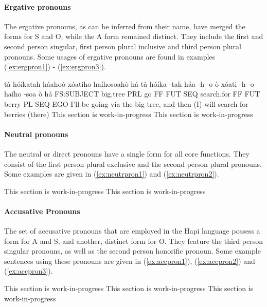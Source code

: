 \documentclass[a4paper, 12pt, oneside]{memoir}
\begin{document}
\paragraph{Ergative pronouns}
The ergative pronouns, as can be inferred from their name, have merged the forms for S and O, while the A form remained distinct. They include the first and second person singular, first person plural inclusive and third person plural pronouns. Some usages of ergative pronouns are found in examples (\ref{ex:ergpron1}) - (\ref{ex:ergpron3}).
\begin{examples}
\newbaarucmd{\cl}{\baarujuncture{\texttt{==}}}
\ex \label{ex:ergpron1}
\words tà hóíkatah háahoò xóatiho haíhosoahò há
\bits tà hóíka -tah háa -h -o \cl ò xóati -h -o haího -soa \cl ò há 
\gloss FS:SUBJECT big.tree PRL go FF FUT SEQ search.for FF FUT berry PL SEQ EGO
\tr I'll be going via the big tree, and then (I) will search for berries (there)
\ex \label{ex:ergpron2}
This section is work-in-progress
\ex \label{ex:ergpron3}
This section is work-in-progress
\end{examples}
\paragraph{Neutral pronouns}
The neutral or direct pronouns have a single form for all core functions. They consist of the first person plural exclusive and the second person plural pronouns. Some examples are given in (\ref{ex:neutrpron1}) and (\ref{ex:neutrpron2}).
\begin{examples}
\ex \label{ex:neutrpron1}
This section is work-in-progress
\ex \label{ex:neutrpron2}
This section is work-in-progress
\end{examples}
\paragraph{Accusative Pronouns}
The set of accusative pronouns that are employed in the Hapi language possess a form for A and S, and another, distinct form for O. They feature the third person singular pronouns, as well as the second person honorific pronoun. Some example sentences using these pronouns are given in (\ref{ex:accpron1}), (\ref{ex:accpron2}) and (\ref{ex:accpron3}).
\begin{examples}
\ex \label{ex:accpron1}
This section is work-in-progress
\ex \label{ex:accpron2}
This section is work-in-progress
\ex \label{ex:accpron3}
This section is work-in-progress
\end{examples}
\end{document}
